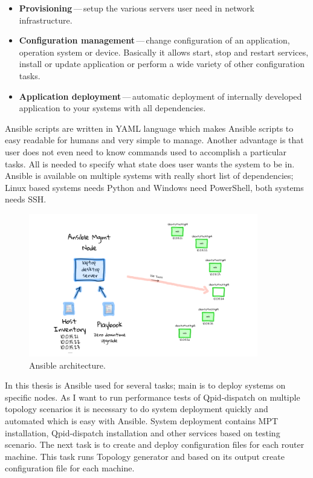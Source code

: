 \begin{itemize}
	\item \textbf{Provisioning}\,---\,setup the various servers user need in network infrastructure.
	\item \textbf{Configuration management}\,---\,change configuration of an application, operation system or device. Basically it allows start, stop and restart services, install or update application or perform a wide variety of other configuration tasks.
	\item \textbf{Application deployment}\,---\,automatic deployment of internally developed application to your systems with all dependencies.
\end{itemize}

Ansible scripts are written in YAML language which makes Ansible scripts to easy readable for humans and very simple to manage. Another advantage is that user does not even need to know commands used to accomplish a particular tasks. All is needed to specify what state does user wants the system to be in. Ansible is available on multiple systems with really short list of dependencies; Linux based systems needs Python and Windows need PowerShell, both systems needs SSH.

\begin{figure}[H]
  \centering
  \includegraphics[width=10cm]{obrazky-figures/ansible.png}
  \caption{Ansible architecture. }
  \label{fig:ansible_architecture}
\end{figure}

In this thesis is Ansible used for several tasks; main is to deploy systems on specific nodes. As I want to run performance tests of Qpid-dispatch on multiple topology scenarios it is necessary to do system deployment quickly and automated which is easy with Ansible. System deployment contains MPT installation, Qpid-dispatch installation and other services based on testing scenario. The next task is to create and deploy configuration files for each router machine. This task runs Topology generator and based on its output create configuration file for each machine. 


